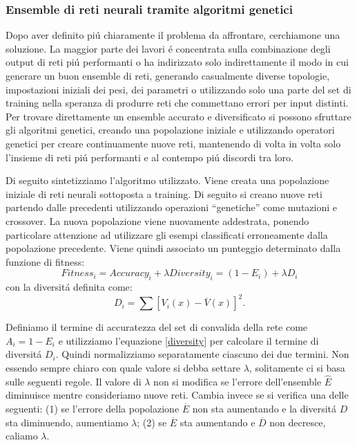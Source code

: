 \documentclass[a4paper,12pt]{report}
\begin{document}
  \subsubsection{Ensemble di reti neurali tramite algoritmi genetici}
  
  Dopo aver definito pi\'u chiaramente il problema da affrontare, cerchiamone una soluzione. 
  La maggior parte dei lavori \'e concentrata sulla combinazione degli output di reti pi\'u performanti o ha indirizzato solo indirettamente il modo in cui generare un buon ensemble di reti, generando casualmente diverse topologie, impostazioni iniziali dei pesi, dei parametri o utilizzando solo una parte del set di training nella speranza di produrre reti che commettano errori per input distinti. 
  Per trovare direttamente un ensemble accurato e diversificato si possono sfruttare gli algoritmi genetici, creando una popolazione iniziale e utilizzando operatori genetici per creare continuamente nuove reti, mantenendo di volta in volta solo l'insieme di reti pi\'u performanti e al contempo pi\'u discordi tra loro. 

  
  Di seguito sintetizziamo l'algoritmo utilizzato. 
  Viene creata una popolazione iniziale di reti neurali sottoposta a training. 
  Di seguito si creano nuove reti partendo dalle precedenti utilizzando operazioni ``genetiche'' come mutazioni e crossover. 
  La nuova popolazione viene nuovamente addestrata, ponendo particolare attenzione ad utilizzare gli esempi classificati erroneamente dalla popolazione precedente. 
  Viene quindi associato un punteggio determinato dalla funzione di fitness:
  \begin{equation}
   Fitness_i = Accuracy_i + \lambda Diversity_i = (1-E_i) + \lambda D_i \label{fitness}
  \end{equation}
  con la diversit\'a definita come:
  \begin{equation}
   D_i = \sum \left[ V_i \left(x\right) - \overline{V} \left(x\right) \right]^2. \label{diversity}
  \end{equation}
  
  Definiamo il termine di accuratezza del set di convalida della rete come $A_i = 1-E_i$ e utilizziamo l'equazione \ref{diversity} per calcolare il termine di diversit\'a $D_i$. 
  Quindi normalizziamo separatamente ciascuno dei due termini. 
  Non essendo sempre chiaro con quale valore si debba settare $\lambda$, solitamente ci si basa sulle seguenti regole. 
  Il valore di $\lambda$ non si modifica se l'errore dell'ensemble $\widehat{E}$ diminuisce mentre consideriamo nuove reti. 
  Cambia invece se si verifica una delle seguenti: (1) se l'errore della popolazione $\overline{E}$ non sta aumentando e la diversit\'a $D$ sta diminuendo, aumentiamo $\lambda$; (2) se $\overline{E}$ sta aumentando e $\overline{D}$ non decresce, caliamo $\lambda$.
  
\end{document}
